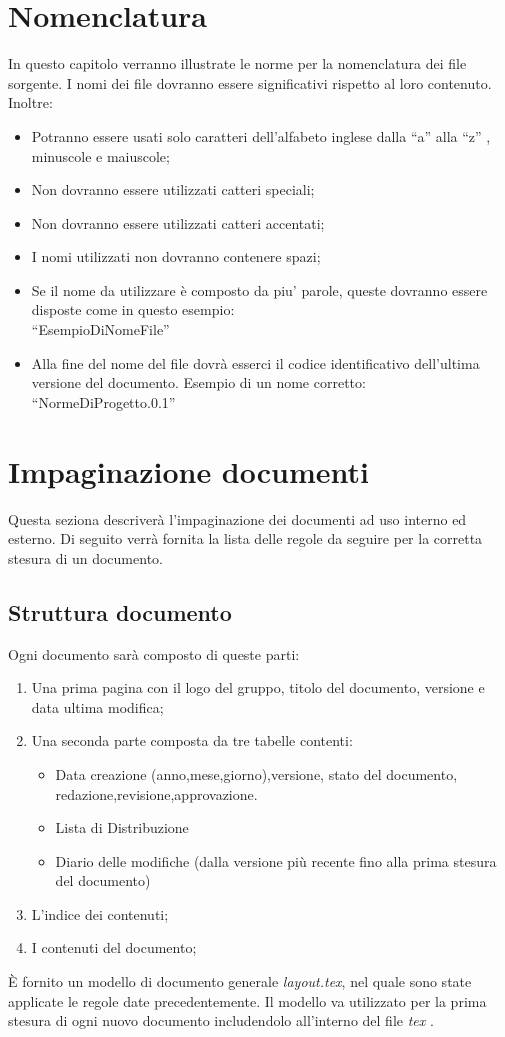 \section{Nomenclatura}
In questo capitolo verranno illustrate le norme per la nomenclatura dei file sorgente. I nomi dei file dovranno essere significativi rispetto al loro contenuto. Inoltre:
\begin{itemize}
\item Potranno essere usati solo caratteri dell'alfabeto inglese dalla ``a'' alla ``z'' , minuscole e maiuscole;
\item Non dovranno essere utilizzati catteri speciali;
\item Non dovranno essere utilizzati catteri accentati;
\item I nomi utilizzati non dovranno contenere spazi;
\item Se il nome da utilizzare \`e composto da piu' parole, queste dovranno essere disposte come in questo esempio: \\
``EsempioDiNomeFile''
\item Alla fine del nome del file dovr\`a esserci il codice identificativo dell'ultima versione del documento.
Esempio di un nome corretto:\\
``NormeDiProgetto.0.1''
\end{itemize}
\section{Impaginazione documenti}
Questa seziona descriver\`a l'impaginazione dei documenti ad uso interno ed esterno. Di seguito verr\`a fornita la lista delle regole da seguire per la corretta stesura di un documento.
\subsection{Struttura documento}
Ogni documento sar\`a composto di queste parti:
\begin{enumerate}
\item Una prima pagina con il logo del gruppo, titolo del documento, versione e data ultima modifica;
\item Una seconda parte composta da tre tabelle contenti:
	{\begin{itemize}
	\item Data creazione (anno,mese,giorno),versione, stato del documento, redazione,revisione,approvazione.
	\item Lista di Distribuzione
	\item Diario delle modifiche (dalla versione pi\`u recente fino alla prima stesura del documento)
	\end{itemize}}
\item L'indice dei contenuti;
\item I contenuti del documento;
\end{enumerate}
\`E fornito un modello di documento generale \textit{layout.tex}, nel quale sono state applicate le regole date precedentemente. Il modello va utilizzato  per la prima stesura di ogni nuovo documento includendolo all'interno del file \textit{tex} .
